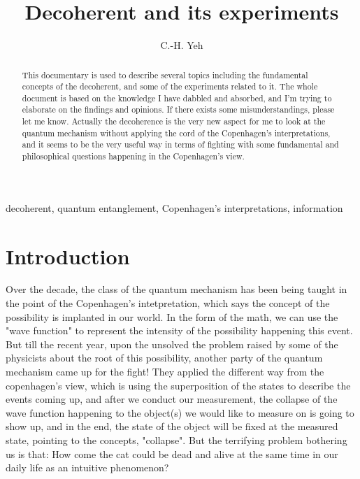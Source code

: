 \documentclass[final,1p,12pt]{elsarticle}
\begin{document}
\begin{frontmatter}

\title{Decoherent and its experiments}

\author[add3]{C.-H. Yeh}



\address[add3]{
Department of Physics and Center for High Energy and High Field Physics, 
National Central University, Chung-Li, Taoyuan City 32001, Taiwan
}





\begin{abstract}
This documentary is used to describe several topics including the fundamental concepts of the decoherent, and some of the experiments related to it. The whole document is based on the knowledge I have dabbled and absorbed, and I'm trying to elaborate on the findings and opinions. If there exists some misunderstandings, please let me know. Actually the decoherence is the very new aspect for me to look at the quantum mechanism without applying the cord of the Copenhagen's interpretations, and it seems to be the very useful way in terms of fighting with some fundamental and philosophical questions happening in the Copenhagen's view. 
\end{abstract}

\begin{keyword}
decoherent, quantum entanglement, Copenhagen's interpretations, information
\end{keyword}
\end{frontmatter}
\tableofcontents



\section{Introduction}
Over the decade, the class of the quantum mechanism has been being taught in the point of the Copenhagen's intetpretation\cite{Hollowood_2015}, which says the concept of the possibility is implanted in our world. In the form of the math, we can use the "wave function" to represent the intensity of the possibility happening this event. But till the recent year, upon the unsolved the problem raised by some of the physicists about the root of this possibility,  another party of the quantum mechanism came up for the fight! They applied the different way from the copenhagen's view,  which is using the superposition of the states to describe the events coming up, and after we conduct our measurement, the collapse of the wave function happening to the object(s) we would like to measure on is going to show up, and in the end, the state of the object will be fixed at the measured state, pointing to the concepts, "collapse". But the terrifying problem bothering us is that: How come the cat could be dead and alive at the same time in our daily life as an intuitive phenomenon?\\
\end{document}
